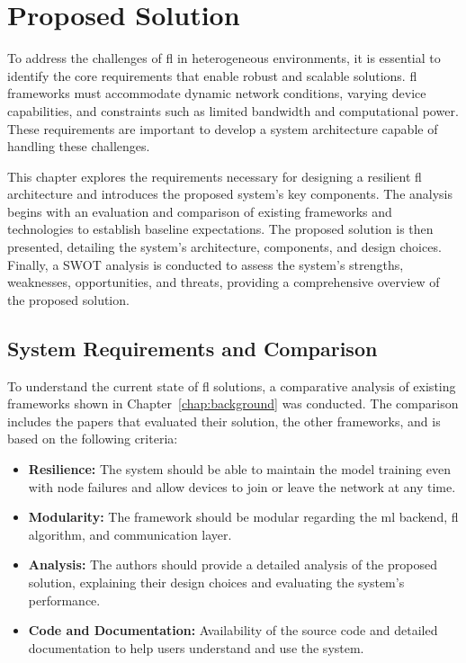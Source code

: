 \chapter{Proposed Solution}
\label{chap:proposed_solution}

\begin{introduction}

To address the challenges of \ac{fl} in heterogeneous environments, it is essential to identify the core requirements that enable robust and scalable solutions. \ac{fl} frameworks must accommodate dynamic network conditions, varying device capabilities, and constraints such as limited bandwidth and computational power. These requirements are important to develop a system architecture capable of handling these challenges. 

This chapter explores the requirements necessary for designing a resilient \ac{fl} architecture and introduces the proposed system's key components. The analysis begins with an evaluation and comparison of existing frameworks and technologies to establish baseline expectations. The proposed solution is then presented, detailing the system's architecture, components, and design choices. Finally, a SWOT analysis is conducted to assess the system's strengths, weaknesses, opportunities, and threats, providing a comprehensive overview of the proposed solution.

\end{introduction}



\section{System Requirements and Comparison}
\label{sec:system_requirements_and_comparison}

To understand the current state of \ac{fl} solutions, a comparative analysis of existing frameworks shown in Chapter~\ref{chap:background} was conducted. The comparison includes the papers that evaluated their solution, the other frameworks, and is based on the following criteria:

\begin{itemize}
    \item \textbf{Resilience:} The system should be able to maintain the model training even with node failures and allow devices to join or leave the network at any time.
    \item \textbf{Modularity:} The framework should be modular regarding the \ac{ml} backend, \ac{fl} algorithm, and communication layer.
    \item \textbf{Analysis:} The authors should provide a detailed analysis of the proposed solution, explaining their design choices and evaluating the system's performance.
    \item \textbf{Code and Documentation:} Availability of the source code and detailed documentation to help users understand and use the system.
\end{itemize}

